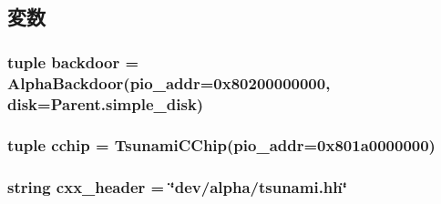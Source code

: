 \subsection{変数}
\hypertarget{classTsunami_1_1Tsunami_ad1cd7522c6e6eb425785dc89f1b36856}{
\subsubsection[{backdoor}]{\setlength{\rightskip}{0pt plus 5cm}tuple {\bf backdoor} = {\bf AlphaBackdoor}(pio\_\-addr=0x80200000000, disk=Parent.simple\_\-disk)}}
\label{classTsunami_1_1Tsunami_ad1cd7522c6e6eb425785dc89f1b36856}
\hypertarget{classTsunami_1_1Tsunami_ac1636e20fc3bb3fadc00255ad114ce3f}{
\subsubsection[{cchip}]{\setlength{\rightskip}{0pt plus 5cm}tuple {\bf cchip} = {\bf TsunamiCChip}(pio\_\-addr=0x801a0000000)}}
\label{classTsunami_1_1Tsunami_ac1636e20fc3bb3fadc00255ad114ce3f}
\hypertarget{classTsunami_1_1Tsunami_a17da7064bc5c518791f0c891eff05fda}{
\subsubsection[{cxx\_\-header}]{\setlength{\rightskip}{0pt plus 5cm}string {\bf cxx\_\-header} = \char`\"{}dev/alpha/tsunami.hh\char`\"{}}}
\label{classTsunami_1_1Tsunami_a17da7064bc5c518791f0c891eff05fda}


